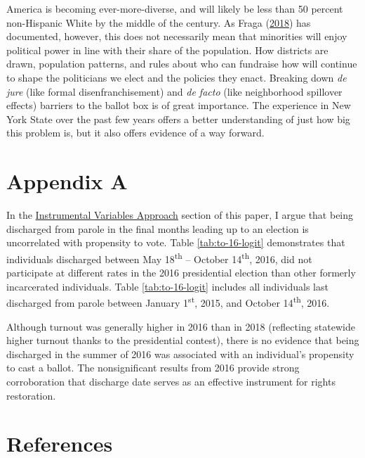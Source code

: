 \documentclass[12pt,]{article}
\begin{document}
America is becoming ever-more-diverse, and will likely be less than 50 percent non-Hispanic White by the middle of the century. As Fraga (\protect\hyperlink{ref-Fraga2018}{2018}) has documented, however, this does not necessarily mean that minorities will enjoy political power in line with their share of the population. How districts are drawn, population patterns, and rules about who can fundraise how will continue to shape the politicians we elect and the policies they enact. Breaking down \emph{de jure} (like formal disenfranchisement) and \emph{de facto} (like neighborhood spillover effects) barriers to the ballot box is of great importance. The experience in New York State over the past few years offers a better understanding of just how big this problem is, but it also offers evidence of a way forward.

\newpage

\hypertarget{appendix-a}{%
\section*{Appendix A}\label{appendix-a}}

In the \protect\hyperlink{instrumental-variables-approach}{Instrumental Variables Approach} section of this paper, I argue that being discharged from parole in the final months leading up to an election is uncorrelated with propensity to vote. Table \ref{tab:to-16-logit} demonstrates that individuals discharged between May 18\textsuperscript{th} -- October 14\textsuperscript{th}, 2016, did not participate at different rates in the 2016 presidential election than other formerly incarcerated individuals. Table \ref{tab:to-16-logit} includes all individuals last discharged from parole between January 1\textsuperscript{st}, 2015, and October 14\textsuperscript{th}, 2016.



Although turnout was generally higher in 2016 than in 2018 (reflecting statewide higher turnout thanks to the presidential contest), there is no evidence that being discharged in the summer of 2016 was associated with an individual's propensity to cast a ballot. The nonsignificant results from 2016 provide strong corroboration that discharge date serves as an effective instrument for rights restoration.

\newpage

\hypertarget{references}{%
\section*{References}\label{references}}
\end{document}
